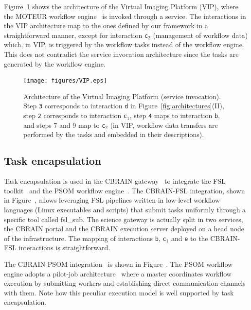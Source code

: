 \documentclass[preprint,3p,twocolumn]{elsarticle}
\begin{document}
{Figure~\ref{fig:vip-architecture} shows the architecture of the
Virtual Imaging Platform (VIP), where the MOTEUR workflow
engine~\cite{GLAT-08i} is invoked through a service. The interactions
in the VIP architecture map to the ones defined by our framework in a
straightforward manner, except for interaction \texttt{c$_2$}
(management of workflow data) which, in VIP, is triggered by the
workflow tasks instead of the workflow engine. This does not
contradict the service invocation architecture since the tasks are
generated by the workflow engine.
\begin{figure}
\texttt{[image: figures/VIP.eps]}
\caption{Architecture of the Virtual Imaging Platform (service
  invocation).  Step \texttt{3} corresponds to interaction \texttt{d}
  in Figure~\ref{fig:architectures}(II), step \texttt{2} corresponds
  to interaction \texttt{c$_1$}, step \texttt{4} maps to interaction
  \texttt{b}, and steps 7 and 9 map to \texttt{c$_2$} (in VIP,
  workflow data transfers are performed by the tasks and embedded in
  their descriptions).}
\label{fig:vip-architecture}
\end{figure}

\subsection{Task encapsulation}

Task encapsulation is used in the CBRAIN gateway~\cite{SHER-14} to
integrate the FSL toolkit~\cite{Jenkinson2012782} and the PSOM
workflow engine~\cite{bellec2012pipeline}. The CBRAIN-FSL integration,
shown in Figure~, allows
leveraging FSL pipelines written in low-level workflow languages
(Linux executables and scripts) that submit tasks uniformly through a
specific tool called fsl\_sub. The science gateway is actually split
in two services, the CBRAIN portal and the CBRAIN execution server
deployed on a head node of the infrastructure. The mapping of
interactions \texttt{b}, \texttt{c$_1$} and \texttt{e} to the
CBRAIN-FSL interactions is straightforward.

The CBRAIN-PSOM integration~\cite{GLAT-16} is shown in
Figure~. The PSOM workflow engine
adopts a pilot-job architecture~\cite{turilli2015comprehensive} where
a master coordinates workflow execution by submitting workers and
establishing direct communication channels with them. Note how this
peculiar execution model is well supported by task encapsulation.

}
\end{document}
